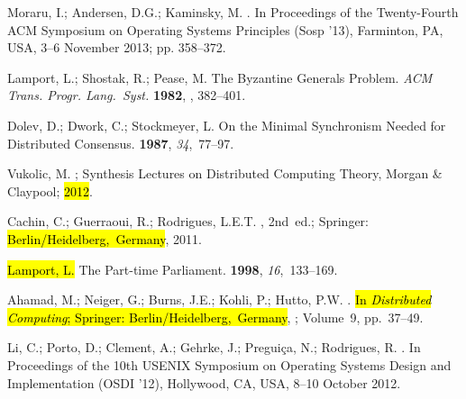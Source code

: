 \documentclass[algorithms,article,accept,moreauthors,pdftex,10pt,a4paper]{Definitions/mdpi}
\begin{document}
\begin{thebibliography}{999}
Moraru, I.; Andersen, D.G.; Kaminsky, M.
.
\newblock In Proceedings of the Twenty-Fourth ACM Symposium on Operating Systems Principles (Sosp '13), Farminton, PA, USA, 3--6 November 2013;  pp. 358--372.

Lamport, L.; Shostak, R.; Pease, M.
\newblock The {Byzantine} Generals Problem. \emph{ACM Trans. Progr. Lang.~Syst.} {\bf 1982},
, 382--401.

Dolev, D.; Dwork, C.; Stockmeyer, L.
\newblock On the Minimal Synchronism Needed for Distributed Consensus.
 {\bf 1987}, {\em 34},~77--97.

Vukolic, M.
;
Synthesis Lectures on Distributed Computing Theory, Morgan {\&} Claypool;
\hl{2012}.%

Cachin, C.; Guerraoui, R.; Rodrigues, L.E.T.
, 2nd~ed.; Springer: \hl{\mbox{Berlin/Heidelberg, Germany}}, 2011.

\hl{Lamport, L.} %
\newblock The Part-time Parliament.
 {\bf 1998}, {\em 16},~133--169.

Ahamad, M.; Neiger, G.; Burns, J.E.; Kohli, P.; Hutto, P.W.
. \hl{In \emph{Distributed Computing}; Springer: \mbox{Berlin/Heidelberg, Germany}}, 
; Volume~9, pp.~37--49.

Li, C.; Porto, D.; Clement, A.; Gehrke, J.; Pregui{\c{c}}a, N.; Rodrigues, R.
.
\newblock In Proceedings of the 10th USENIX Symposium on Operating Systems Design and Implementation (OSDI ’12), Hollywood, CA, USA, 8--10 October 2012.

\end{thebibliography}
\end{document}

